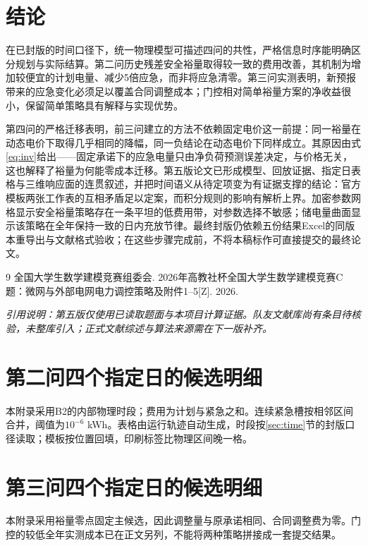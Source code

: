 \documentclass[UTF8,a4paper,zihao=-4,fontset=fandol]{ctexart}
\begin{document}
\section{结论}
在已封版的时间口径下，统一物理模型可描述四问的共性，严格信息时序能明确区分规划与实际结算。第二问历史残差安全裕量取得较一致的费用改善，其机制为增加较便宜的计划电量、减少5倍应急，而非将应急清零。第三问实测表明，新预报带来的应急变化必须足以覆盖合同调整成本；门控相对简单裕量方案的净收益很小，保留简单策略具有解释与实现优势。

第四问的严格迁移表明，前三问建立的方法不依赖固定电价这一前提：同一裕量在动态电价下取得几乎相同的降幅，同一负结论在动态电价下同样成立。其原因由式\eqref{eq:inv}给出——固定承诺下的应急电量只由净负荷预测误差决定，与价格无关，这也解释了裕量为何能零成本迁移。第五版论文已形成模型、回放证据、指定日表格与三维响应面的连贯叙述，并把时间语义从待定项变为有证据支撑的结论：官方模板两张工作表的互相矛盾足以定案，而积分规则的影响有解析上界。加密参数网格显示安全裕量策略存在一条平坦的低费用带，对参数选择不敏感；储电量曲面显示该策略在全年保持一致的日内充放节律。最终封版仍依赖五份结果Excel的同版本重导出与文献格式验收；在这些步骤完成前，不将本稿标作可直接提交的最终论文。

\begin{thebibliography}{9}
 全国大学生数学建模竞赛组委会. 2026年高教社杯全国大学生数学建模竞赛C题：微网与外部电网电力调控策略及附件1--5[Z]. 2026.
\end{thebibliography}
\noindent\textit{引用说明：第五版仅使用已读取题面与本项目计算证据。队友文献库尚有条目待核验，未整库引入；正式文献综述与算法来源需在下一版补齐。}

\appendix
\section{第二问四个指定日的候选明细}
本附录采用B2的内部物理时段；费用为计划与紧急之和。连续紧急槽按相邻区间合并，阈值为$10^{-6}$ kWh。表格由运行轨迹自动生成，时段按\ref{sec:time}节的封版口径读取；模板按位置回填，印刷标签比物理区间晚一格。

\section{第三问四个指定日的候选明细}
本附录采用裕量零点固定主候选，因此调整量与原承诺相同、合同调整费为零。门控的较低全年实测成本已在正文另列，不能将两种策略拼接成一套提交结果。

\end{document}
